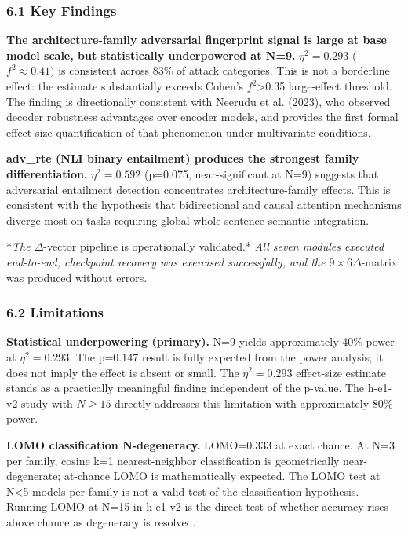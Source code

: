 
\subsubsection{6.1 Key Findings}

\textbf{The architecture-family adversarial fingerprint signal is large at base model scale, but statistically underpowered at N=9.} $\eta^{2}=0.293$ ($f^{2}\approx 0.41)$ is consistent across 83\% of attack categories. This is not a borderline effect: the estimate substantially exceeds Cohen's $f^2$>0.35 large-effect threshold. The finding is directionally consistent with Neerudu et al. (2023), who observed decoder robustness advantages over encoder models, and provides the first formal effect-size quantification of that phenomenon under multivariate conditions.

\textbf{adv\_rte (NLI binary entailment) produces the strongest family differentiation.} $\eta^{2}=0.592$ (p=0.075, near-significant at N=9) suggests that adversarial entailment detection concentrates architecture-family effects. This is consistent with the hypothesis that bidirectional and causal attention mechanisms diverge most on tasks requiring global whole-sentence semantic integration.

*\textit{The $\Delta$}-vector pipeline is operationally validated.*\textit{ All seven modules executed end-to-end, checkpoint recovery was exercised successfully, and the $9\times 6 \Delta$}-matrix was produced without errors.

\subsubsection{6.2 Limitations}

\textbf{Statistical underpowering (primary).} N=9 yields approximately 40\% power at $\eta^{2}=0.293$. The p=0.147 result is fully expected from the power analysis; it does not imply the effect is absent or small. The $\eta^{2}=0.293$ effect-size estimate stands as a practically meaningful finding independent of the p-value. The h-e1-v2 study with $N\geq 15$ directly addresses this limitation with approximately 80\% power.

\textbf{LOMO classification N-degeneracy.} LOMO=0.333 at exact chance. At N=3 per family, cosine k=1 nearest-neighbor classification is geometrically near-degenerate; at-chance LOMO is mathematically expected. The LOMO test at N<5 models per family is not a valid test of the classification hypothesis. Running LOMO at N=15 in h-e1-v2 is the direct test of whether accuracy rises above chance as degeneracy is resolved.

